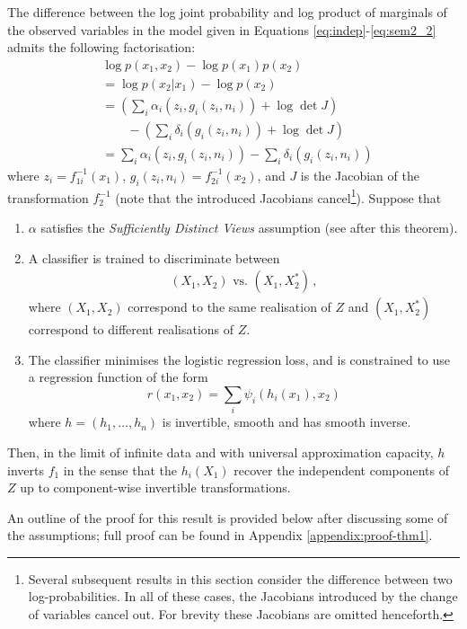 \begin{theorem}
	\label{thm:noiseless1}
	The difference between the log joint probability and log product of marginals of the observed variables in the model given in Equations \ref{eq:indep}-\ref{eq:sem2_2} admits the following factorisation:
	\begin{align}
	&\log p({x}_1, {x}_2) - \log p({x}_1) p({x}_2) \nonumber \\
	&= \log p({x}_2 | {x}_1) - \log p({x}_2) \nonumber\\
	&= \left(\sum_i \alpha_i(z_{i}, g_i(z_i, n_i)) + \log \det J \right) \nonumber\\
	&\qquad - \left( \sum_i \delta_i(g_i(z_i, n_i)) + \log \det J\right) \nonumber\\
	&= \sum_i \alpha_i(z_{i}, g_i(z_i, n_i)) - \sum_i \delta_i(g_i(z_i, n_i))\label{eq:logdens_noiesless_1} \,
	\end{align}
	where $z_i=f^{-1}_{1i}({x}_1)$, $g_i(z_i, n_i)=f^{-1}_{2i}({x}_2)$,
	and $J$ is the Jacobian of the transformation $f^{-1}_2$ (note that the introduced Jacobians cancel\footnote{Several subsequent results in this section consider the difference between two log-probabilities.
In all of these cases, the Jacobians introduced by the change of variables cancel out.
For brevity these Jacobians are omitted henceforth.}).
	Suppose that
	\begin{enumerate}
		\item $\alpha$ satisfies the \emph{Sufficiently Distinct Views} assumption (see after this theorem).
		\item A classifier is trained to discriminate between
		\begin{align*}
		(X_{1},X_{2}) \text{ vs. } (X_{1},X_{2}^{*})\,,
		\end{align*}
		where $({X}_{1},{X}_{2})$ correspond to the same realisation of $Z$ and $({X}_{1},{X}_{2}^{*})$ correspond to different realisations of ${Z}$.
		\item The classifier minimises the logistic regression loss, and is constrained to use a regression function of the form
		\begin{equation*}
		r({x}_{1},{x}_{2})=\sum_{i}\psi_{i}(h_{i}({x}_{1}),{x}_{2})
		\end{equation*}
		where ${h} =(h_{1}, \ldots, h_{n})$  is invertible, smooth and has smooth inverse.
	\end{enumerate}
	
	Then, in the limit of infinite data and with universal approximation capacity, $h$ inverts ${f}_1$ in the sense that the $h_{i}(X_1)$ recover the independent components of $Z$ up to component-wise invertible transformations.
\end{theorem}
An outline of the proof for this result is provided below after discussing some of the assumptions; full proof can be found in Appendix \ref{appendix:proof-thm1}.


